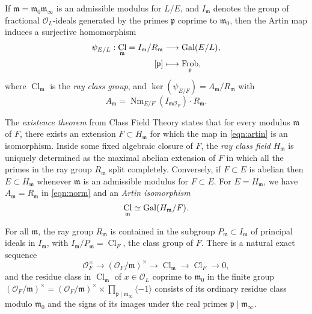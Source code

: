 \documentclass[smallextended]{svjour3}
\newcommand{\G}{{\rm Gal}}
\newcommand{\Or}{\mathcal{O}}
\DeclareMathOperator{\frob}{Frob}
\DeclareMathOperator{\Cl}{Cl}
\DeclareMathOperator{\Nm}{Nm}
\begin{document}
 If $\mathfrak m=\mathfrak m_0\mathfrak m_{\infty}$ is an admissible modulus for $L/E$, and $I_{\mathfrak m}$ denotes the group of fractional $\Or_L$-ideals generated by the primes $\mathfrak p$ coprime to $\mathfrak m_0$, then the Artin map induces a surjective homomorphism 
\begin{align}
\label{eqn:artin}
\begin{split}
	\psi_{E/L}: \Cl_{\mathfrak m} = I_{\mathfrak m}/R_{\mathfrak m} &\longrightarrow \G(E/L),\\
	[\mathfrak p] &\longmapsto \frob_{\mathfrak p},
\end{split} 
\end{align}
where $\Cl_{\mathfrak m}$ is the \emph{ray class group}, and $\ker(\psi_{E/F}) = A_{\mathfrak m}/R_{\mathfrak m}$ with
\begin{equation} 
\label{eqn:norm}
	A_{\mathfrak m} = \Nm_{E/F}(I_{\mathfrak m\Or_F})\cdot R_{\mathfrak m}.
\end{equation}

The \textit{existence theorem} from Class Field Theory states that for every modulus $\mathfrak m$ of $F$, there exists an extension $F\subset H_{\mathfrak m}$ for which the map in \eqref{eqn:artin} is an isomorphism. Inside some fixed algebraic closure of $F$, the \textit{ray class field} $H_{\mathfrak m}$ is uniquely determined as the maximal abelian extension  of $F$ in which all the primes in the ray group $R_{\mathfrak m}$ split completely. Conversely, if $F\subset E$ is abelian then $E \subset H_{\mathfrak m}$ whenever $\mathfrak m$ is an admissible modulus for $F\subset E$. For $E = H_{\mathfrak m}$, we have $A_{\mathfrak m} = R_{\mathfrak m}$ in \eqref{eqn:norm} and an \textit{Artin isomorphism} 
\begin{equation}
\label{eqn:artiniso}
	\Cl_{\mathfrak m} \simeq \G(H_{\mathfrak m}/F).
\end{equation}
	
For all $\mathfrak m$, the ray group $R_{\mathfrak m}$ is contained in the subgroup $P_{\mathfrak m} \subset I_{\mathfrak m}$ of principal ideals in $I_{\mathfrak m}$, with $I_{\mathfrak m}/P_{\mathfrak m} = \Cl_{F}$, the class group of $F$. There is a natural exact sequence
\begin{equation}
\label{eqn:exact}
	\Or_{F}^{\times} \longrightarrow (\Or_F/\mathfrak m)^{\times} \longrightarrow \Cl_{\mathfrak m} \longrightarrow \Cl_{F}\longrightarrow 0,
\end{equation}
and the residue class in $\Cl_{\mathfrak m}$ of $x \in \Or_L$ coprime to $\mathfrak m_0$ in the finite group $(\Or_F/\mathfrak m)^{\times} = (\Or_F/\mathfrak m)^{\times}\times\prod_{\mathfrak p\mid \mathfrak m_{\infty}}\langle -1 \rangle $ consists of its ordinary residue class modulo $\mathfrak m_0$ and the signs of its images under the real primes $\mathfrak p \mid \mathfrak m_{\infty}$.
	
\end{document}
